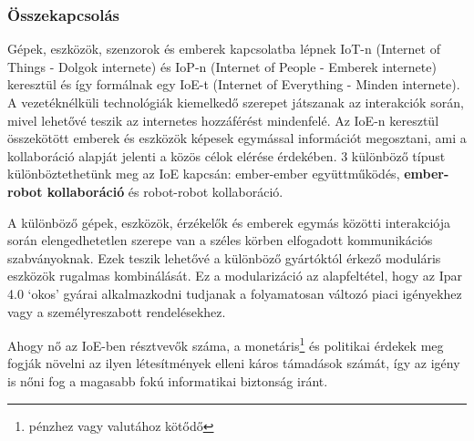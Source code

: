 \documentclass[../documentation.tex]{subfiles}
\begin{document}
\subsubsection{Összekapcsolás}
Gépek, eszközök, szenzorok és emberek kapcsolatba lépnek IoT-n (\foreignlanguage{british}{Internet of Things} - Dolgok internete) és IoP-n (\foreignlanguage{british}{Internet of People} - Emberek internete\cite{iop}) keresztül és így formálnak egy IoE-t (\foreignlanguage{british}{Internet of Everything} - Minden internete\cite{ioe}). A vezetéknélküli technológiák kiemelkedő szerepet játszanak az interakciók során, mivel lehetővé teszik az internetes hozzáférést mindenfelé. Az IoE-n keresztül összekötött emberek és eszközök képesek egymással információt megosztani, ami a kollaboráció alapját jelenti a közös célok elérése érdekében. 3 különböző típust különböztethetünk meg az IoE kapcsán: ember-ember együttműködés, \textbf{ember-robot kollaboráció} és robot-robot kollaboráció.\cite{collabtypes}

A különböző gépek, eszközök, érzékelők és emberek egymás közötti interakciója során elengedhetetlen szerepe van a széles körben elfogadott kommunikációs szabványoknak. Ezek teszik lehetővé a különböző gyártóktól érkező moduláris eszközök rugalmas kombinálását. Ez a modularizáció az alapfeltétel, hogy az Ipar 4.0 `okos' gyárai alkalmazkodni tudjanak a folyamatosan változó piaci igényekhez vagy a személyreszabott rendelésekhez.

Ahogy nő az IoE-ben résztvevők száma, a monetáris\footnote{pénzhez vagy valutához kötődő} és politikai érdekek meg fogják növelni az ilyen létesítmények elleni káros támadások számát, így az igény is nőni fog a magasabb fokú informatikai biztonság iránt.
\end{document}
